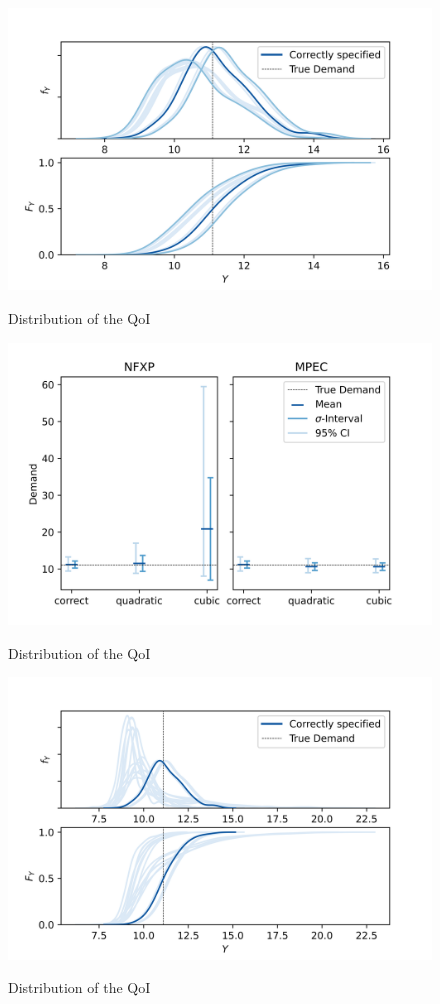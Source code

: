 \begin{figure}[H]
	\caption{Distribution of the QoI}
	\vspace*{-4mm}
	\centering
	\includegraphics[scale=0.9]{../figures/figure_11.png}
	\label{figure11}
\end{figure}

\begin{figure}[H]
	\caption{Distribution of the QoI}
	\vspace*{-4mm}
	\centering
	\includegraphics[scale=0.9]{../figures/figure_12.png}
	\label{figure12}
\end{figure}

\begin{figure}[H]
	\caption{Distribution of the QoI}
	\vspace*{-4mm}
	\centering
	\includegraphics[scale=0.9]{../figures/figure_13.png}
	\label{figure13}
\end{figure}

